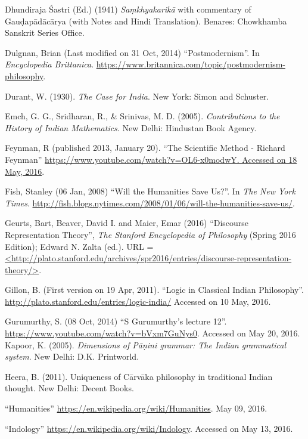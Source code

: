 \begin{thebibliography}{99}
Dhundiraja Śastri (Ed.) (1941) {\sl Saṃkhyakarikā} with commentary of Gauḍapādācārya (with Notes and Hindi Translation). Benares: Chowkhamba Sanskrit Series Office.

Dulgnan, Brian (Last modified on 31 Oct, 2014) ``Postmodernism''. In {\sl Encyclopedia Brittanica}. \url{https://www.britannica.com/topic/postmodernism-philosophy}. 

Durant, W. (1930). {\sl The Case for India}. New York: Simon and Schuster.

Emch, G. G., Sridharan, R., \& Srinivas, M. D. (2005). {\sl Contributions to the History of Indian Mathematics}. New Delhi: Hindustan Book Agency.

Feynman, R (published 2013, January 20). ``The Scientific Method - Richard Feynman'' \url{https://www.youtube.com/watch?v=OL6-x0modwY. Accessed on 18 May, 2016}.

Fish, Stanley (06 Jan, 2008) ``Will the Humanities Save Us?''. In {\sl The New York Times}. \url{http://fish.blogs.nytimes.com/2008/01/06/will-the-humanities-save-us/}. 

Geurts, Bart, Beaver, David I. and Maier, Emar (2016) ``Discourse Representation Theory'', {\sl The Stanford Encyclopedia of Philosophy} (Spring 2016 Edition); Edward N. Zalta (ed.). URL = \url{<http://plato.stanford.edu/archives/spr2016/entries/discourse-representation-theory/>}.

Gillon, B. (First version on 19 Apr, 2011). ``Logic in Classical Indian Philosophy''. \url{http://plato.stanford.edu/entries/logic-india/} Accessed on 10 May, 2016.

Gurumurthy, S. (08 Oct, 2014) ``S Gurumurthy's lecture 12''. \url{https://www.youtube.com/watch?v=bVxm7GuNys0}. Accessed on May 20, 2016. Kapoor, K. (2005). {\sl Dimensions of Pāṇini grammar: The Indian grammatical system}. New Delhi: D.K. Printworld.

Heera, B. (2011). Uniqueness of Cārvāka philosophy in traditional Indian thought. New Delhi: Decent Books.

``Humanities''  \url{https://en.wikipedia.org/wiki/Humanities}. May 09, 2016. 

``Indology'' \url{ https://en.wikipedia.org/wiki/Indology}. Accessed on May 13, 2016.


\end{thebibliography}
